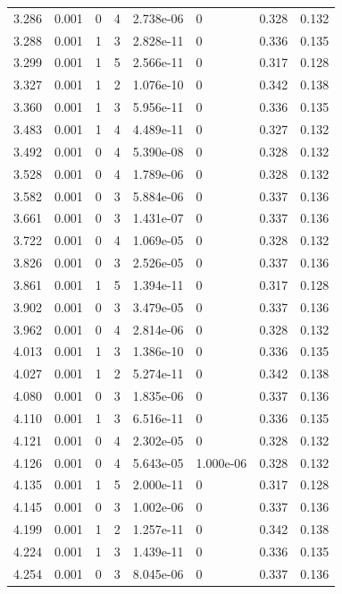 \documentclass[preview]{standalone}
\begin{document}
{{{\begin{tabular}{L{1.2cm}C{1.2cm} C{0.3cm}C{0.5cm} C{1.4cm}C{1.4cm} C{1.4cm}C{1.4cm}}
  3.286  &  0.001  & 0     &  4 &  2.738e-06  & 0  & 0.328 &  0.132   \\ 
  3.288  &  0.001  & 1     &  3 &  2.828e-11  & 0  & 0.336 &  0.135   \\ 
  3.299  &  0.001  & 1     &  5 &  2.566e-11  & 0  & 0.317 &  0.128   \\ 
  3.327  &  0.001  & 1     &  2 &  1.076e-10  & 0  & 0.342 &  0.138   \\ 
  3.360  &  0.001  & 1     &  3 &  5.956e-11  & 0  & 0.336 &  0.135   \\ 
  3.483  &  0.001  & 1     &  4 &  4.489e-11  & 0  & 0.327 &  0.132   \\ 
  3.492  &  0.001  & 0     &  4 &  5.390e-08  & 0  & 0.328 &  0.132   \\ 
  3.528  &  0.001  & 0     &  4 &  1.789e-06  & 0  & 0.328 &  0.132   \\ 
  3.582  &  0.001  & 0     &  3 &  5.884e-06  & 0  & 0.337 &  0.136   \\ 
  3.661  &  0.001  & 0     &  3 &  1.431e-07  & 0  & 0.337 &  0.136   \\ 
  3.722  &  0.001  & 0     &  4 &  1.069e-05  & 0  & 0.328 &  0.132   \\ 
  3.826  &  0.001  & 0     &  3 &  2.526e-05  & 0  & 0.337 &  0.136   \\ 
  3.861  &  0.001  & 1     &  5 &  1.394e-11  & 0  & 0.317 &  0.128   \\ 
  3.902  &  0.001  & 0     &  3 &  3.479e-05  & 0  & 0.337 &  0.136   \\ 
  3.962  &  0.001  & 0     &  4 &  2.814e-06  & 0  & 0.328 &  0.132   \\ 
  4.013  &  0.001  & 1     &  3 &  1.386e-10  & 0  & 0.336 &  0.135   \\ 
  4.027  &  0.001  & 1     &  2 &  5.274e-11  & 0  & 0.342 &  0.138   \\ 
  4.080  &  0.001  & 0     &  3 &  1.835e-06  & 0  & 0.337 &  0.136   \\ 
  4.110  &  0.001  & 1     &  3 &  6.516e-11  & 0  & 0.336 &  0.135   \\ 
  4.121  &  0.001  & 0     &  4 &  2.302e-05  & 0  & 0.328 &  0.132   \\ 
  4.126  &  0.001  & 0     &  4 &  5.643e-05  & 1.000e-06  & 0.328 &  0.132   \\ 
  4.135  &  0.001  & 1     &  5 &  2.000e-11  & 0  & 0.317 &  0.128   \\ 
  4.145  &  0.001  & 0     &  3 &  1.002e-06  & 0  & 0.337 &  0.136   \\ 
  4.199  &  0.001  & 1     &  2 &  1.257e-11  & 0  & 0.342 &  0.138   \\ 
  4.224  &  0.001  & 1     &  3 &  1.439e-11  & 0  & 0.336 &  0.135   \\ 
  4.254  &  0.001  & 0     &  3 &  8.045e-06  & 0  & 0.337 &  0.136   \\ 
\hline 
\end{tabular} 

}}}
\end{document}
